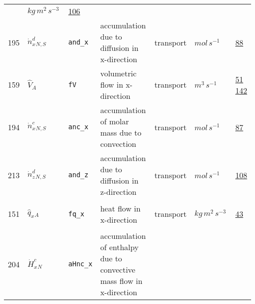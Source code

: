 \begin{longtable}{|p{1cm}|p{2.5cm}|p{4.5cm}|p{8cm}|p{3.0cm}|p{3cm}|p{1cm}|}
             & $ kg \,m^{2} \,s^{-3} \, $
             &                 \hyperlink{"e:106"}{ 106 }
                 \\
            195
             & \hypertarget{"v:195"}{ $ {{\dot{n}^d_x}}{_{N, S}} $}
             & \verb|and_x|
             & accumulation due to diffusion in x-direction
             & \begin{lay}transport \end{lay}
             & $ mol \,s^{-1} \, $
             &                 \hyperlink{"e:88"}{ 88 }
                 \\
            159
             & \hypertarget{"v:159"}{ $ {{\hat{V}}}{_{A}} $}
             & \verb|fV|
             & volumetric flow in x-direction
             & \begin{lay}transport \end{lay}
             & $ m^{3} \,s^{-1} \, $
             &                 \hyperlink{"e:51"}{ 51 }
                                 \hyperlink{"e:142"}{ 142 }
                 \\
            194
             & \hypertarget{"v:194"}{ $ {{\dot{n}^c_x}}{_{N, S}} $}
             & \verb|anc_x|
             & accumulation of molar mass due to convection
             & \begin{lay}transport \end{lay}
             & $ mol \,s^{-1} \, $
             &                 \hyperlink{"e:87"}{ 87 }
                 \\
            213
             & \hypertarget{"v:213"}{ $ {{\dot{n}^d_z}}{_{N, S}} $}
             & \verb|and_z|
             & accumulation due to diffusion in z-direction
             & \begin{lay}transport \end{lay}
             & $ mol \,s^{-1} \, $
             &                 \hyperlink{"e:108"}{ 108 }
                 \\
            151
             & \hypertarget{"v:151"}{ $ {{\hat{q}_x}}{_{A}} $}
             & \verb|fq_x|
             & heat flow in x-direction
             & \begin{lay}transport \end{lay}
             & $ kg \,m^{2} \,s^{-3} \, $
             &                 \hyperlink{"e:43"}{ 43 }
                 \\
            204
             & \hypertarget{"v:204"}{ $ {{\dot{H}^c_x}}{_{N}} $}
             & \verb|aHnc_x|
             & accumulation of enthalpy due to convective mass flow in x-direction

\end{longtable}
